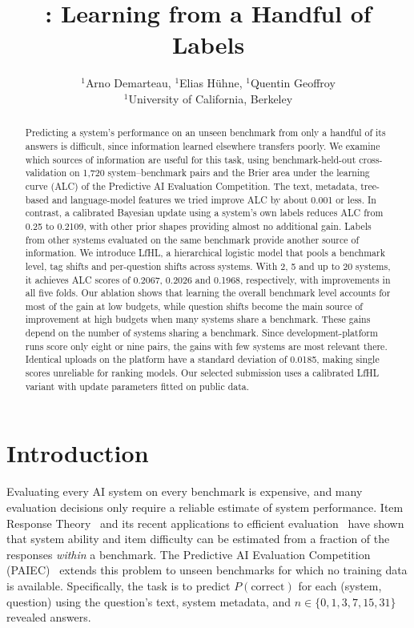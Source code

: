 \documentclass{article}
\title{\lfhl: Learning from a Handful of Labels}
\author{%
  \normalfont $^{1}$Arno Demarteau, $^{1}$Elias H\"uhne, $^{1}$Quentin Geoffroy \\
  $^{1}$University of California, Berkeley
}
\newcommand{\lfhl}{LfHL}
\begin{document}
\maketitle

\begin{abstract}
Predicting a system's performance on an unseen benchmark from only a handful of its answers is difficult, since information learned elsewhere transfers poorly. We examine which sources of information are useful for this task, using benchmark-held-out cross-validation on 1{,}720 system--benchmark pairs and the Brier area under the learning curve (ALC) of the Predictive AI Evaluation Competition. The text, metadata, tree-based and language-model features we tried improve ALC by about 0.001 or less. In contrast, a calibrated Bayesian update using a system's own labels reduces ALC from 0.25 to 0.2109, with other prior shapes providing almost no additional gain. Labels from other systems evaluated on the same benchmark provide another source of information. We introduce \lfhl{}, a hierarchical logistic model that pools a benchmark level, tag shifts and per-question shifts across systems. With 2, 5 and up to 20 systems, it achieves ALC scores of 0.2067, 0.2026 and 0.1968, respectively, with improvements in all five folds. Our ablation shows that learning the overall benchmark level accounts for most of the gain at low budgets, while question shifts become the main source of improvement at high budgets when many systems share a benchmark. These gains depend on the number of systems sharing a benchmark. Since development-platform runs score only eight or nine pairs, the gains with few systems are most relevant there. Identical uploads on the platform have a standard deviation of 0.0185, making single scores unreliable for ranking models. Our selected submission uses a calibrated \lfhl{} variant with update parameters fitted on public data.
\end{abstract}


\section{Introduction}
\label{sec:intro}

Evaluating every AI system on every benchmark is expensive, and many evaluation decisions only require a reliable estimate of system performance. Item Response Theory~\citep{Rasch1980,lord1980applications,lalor-etal-2016-building} and its recent applications to efficient evaluation~\citep{Rodriguez:Barrow:Hoyle:Lalor:Jia:Boyd-Graber-2021,polo2024tinybenchmarks} have shown that system ability and item difficulty can be estimated from a fraction of the responses \emph{within} a benchmark. The Predictive AI Evaluation Competition (PAIEC)~\citep{paiec2026} extends this problem to unseen benchmarks for which no training data is available. Specifically, the task is to predict $P(\text{correct})$ for each (system, question) using the question's text, system metadata, and $n \in \{0,1,3,7,15,31\}$ revealed answers.
\end{document}
